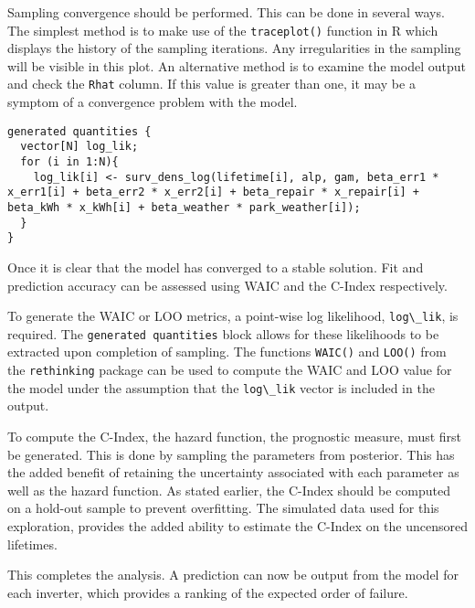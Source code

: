 Sampling convergence should be performed. This can be done in several ways. The simplest method is to make use of the \lstinline{traceplot()} function in R which displays the history of the sampling iterations. Any irregularities in the sampling will be visible in this plot. An alternative method is to examine the model output and check the \lstinline{Rhat} column. If this value is greater than one, it may be a symptom of a convergence problem with the model.

\begin{lstlisting}
generated quantities {
  vector[N] log_lik;
  for (i in 1:N){
  	log_lik[i] <- surv_dens_log(lifetime[i], alp, gam, beta_err1 * x_err1[i] + beta_err2 * x_err2[i] + beta_repair * x_repair[i] + beta_kWh * x_kWh[i] + beta_weather * park_weather[i]);
  }
}
\end{lstlisting}

Once it is clear that the model has converged to a stable solution. Fit and prediction accuracy can be assessed using WAIC and the C-Index respectively. 

To generate the WAIC or LOO metrics, a point-wise log likelihood, \lstinline{log\_lik}, is required. The \lstinline{generated quantities} block allows for these likelihoods to be extracted upon completion of sampling. The functions \lstinline{WAIC()} and \lstinline{LOO()} from the \lstinline{rethinking} package can be used to compute the WAIC and LOO value for the model under the assumption that the \lstinline{log\_lik} vector is included in the output. 

To compute the C-Index, the hazard function, the prognostic measure, must first be generated. This is done by sampling the parameters from posterior. This has the added benefit of retaining the uncertainty associated with each parameter as well as the hazard function. As stated earlier, the C-Index should be computed on a hold-out sample to prevent overfitting. The simulated data used for this exploration, provides the added ability to estimate the C-Index on the uncensored lifetimes. 

This completes the analysis. A prediction can now be output from the model for each inverter, which provides a ranking of the expected order of failure. 



